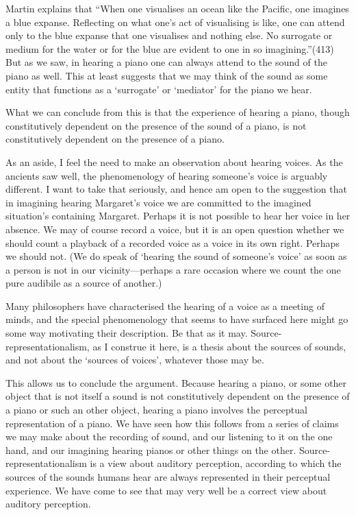 \documentclass[sloppy, journal, git, bytitle, dodraft]{humapap}
\begin{document}
Martin explains that ``When one visualises an ocean like the Pacific, one imagines a blue expanse. Reflecting on what one’s act of visualising is like, one can attend only to the blue expanse that one visualises and nothing else. No surrogate or medium for the water or for the blue are evident to one in so imagining.''(413) But as we saw, in hearing a piano one can always attend to the sound of the piano as well. This at least suggests that we may think of the sound as some entity that functions as a `surrogate' or `mediator' for the piano we hear. 

What we can conclude from this is that the experience of hearing a piano, though constitutively dependent on the presence of the sound of a piano, is not constitutively dependent on the presence of a piano. 

\sect As an aside, I feel the need to make an observation about hearing voices. As the ancients saw well, the phenomenology of hearing someone's voice is arguably different. I want to take that seriously, and hence am open to the suggestion that in imagining hearing Margaret's voice we are committed to the imagined situation's containing Margaret. Perhaps it is not possible to hear her voice in her absence. We may of course record a voice, but it is an open question whether we should count a playback of a recorded voice as a voice in its own right. Perhaps we should not. (We do speak of `hearing the sound of someone's voice' as soon as a person is not in our vicinity---perhaps a rare occasion where we count the one pure audibile as a source of another.) 

Many philosophers have characterised the hearing of a voice as a meeting of minds, and the special phenomenology that seems to have surfaced here might go some way motivating their description. Be that as it may. Source-representationalism, as I construe it here, is a thesis about the sources of sounds, and not about the `sources of voices', whatever those may be.


\sect This allows us to conclude the argument. Because hearing a piano, or some other object that is not itself a sound is not constitutively dependent on the presence of a piano or such an other object, hearing a piano involves the perceptual representation of a piano. We have seen how this follows from a series of claims we may make about the recording of sound, and our listening to it on the one hand, and our imagining hearing pianos or other things on the other. Source-representationalism is a view about auditory perception, according to which the sources of the sounds humans hear are always represented in their perceptual experience. We have come to see that may very well be a correct view about auditory perception.
\end{document}
